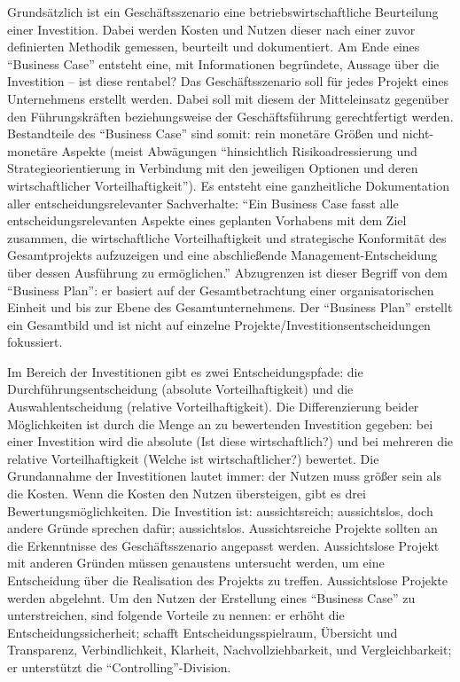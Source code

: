 Grundsätzlich ist ein Geschäftsszenario eine betriebswirtschaftliche Beurteilung einer Investition. Dabei werden Kosten und Nutzen dieser nach einer zuvor definierten Methodik gemessen, beurteilt und dokumentiert. Am Ende eines \enquote{Business Case} entsteht eine, mit Informationen begründete, Aussage über die Investition -- ist diese rentabel? Das Geschäftsszenario soll für jedes Projekt eines Unternehmens erstellt werden. Dabei soll mit diesem der Mitteleinsatz gegenüber den Führungskräften beziehungsweise der Geschäftsführung gerechtfertigt werden. Bestandteile des \enquote{Business Case} sind somit: rein monetäre Größen und nicht-monetäre Aspekte (meist Abwägungen \enquote{hinsichtlich Risikoadressierung und Strategieorientierung in Verbindung mit den jeweiligen Optionen und deren wirtschaftlicher Vorteilhaftigkeit}\autocite[][S.\,12]{brugger_it_2009}). Es entsteht eine ganzheitliche Dokumentation aller entscheidungsrelevanter Sachverhalte: \enquote{Ein Business Case fasst alle entscheidungsrelevanten Aspekte eines geplanten Vorhabens mit dem Ziel zusammen, die wirtschaftliche Vorteilhaftigkeit und strategische Konformität des Gesamtprojekts aufzuzeigen und eine abschließende Management-Entscheidung über dessen Ausführung zu ermöglichen.}\autocite[][S.\,13]{brugger_it_2009} Abzugrenzen ist dieser Begriff von dem \enquote{Business Plan}: er basiert auf der Gesamtbetrachtung einer organisatorischen Einheit und bis zur Ebene des Gesamtunternehmens. Der \enquote{Business Plan} erstellt ein Gesamtbild und ist nicht auf einzelne Projekte/Investitionsentscheidungen fokussiert. 
\par
Im Bereich der Investitionen gibt es zwei Entscheidungspfade: die Durchführungsentscheidung (absolute Vorteilhaftigkeit) und die Auswahlentscheidung (relative Vorteilhaftigkeit).\autocite[vgl.][S.\,14]{brugger_it_2009} Die Differenzierung beider Möglichkeiten ist durch die Menge an zu bewertenden Investition gegeben: bei einer Investition wird die absolute (Ist diese wirtschaftlich?) und bei mehreren die relative Vorteilhaftigkeit (Welche ist wirtschaftlicher?) bewertet. Die Grundannahme der Investitionen lautet immer: der Nutzen muss größer sein als die Kosten. Wenn die Kosten den Nutzen übersteigen, gibt es drei Bewertungsmöglichkeiten. Die Investition ist: aussichtsreich; aussichtslos, doch andere Gründe sprechen dafür; aussichtslos. Aussichtsreiche Projekte sollten an die Erkenntnisse des Geschäftsszenario angepasst werden. Aussichtslose Projekt mit anderen Gründen müssen genaustens untersucht werden, um eine Entscheidung über die Realisation des Projekts zu treffen. Aussichtslose Projekte werden abgelehnt. Um den Nutzen der Erstellung eines \enquote{Business Case} zu unterstreichen, sind folgende Vorteile zu nennen: er erhöht die Entscheidungssicherheit; schafft Entscheidungsspielraum, Übersicht und Transparenz, Verbindlichkeit, Klarheit, Nachvollziehbarkeit, und Vergleichbarkeit; er unterstützt die \enquote{Controlling}-Division.\autocite[vgl.][S.\,17]{brugger_it_2009} \par
